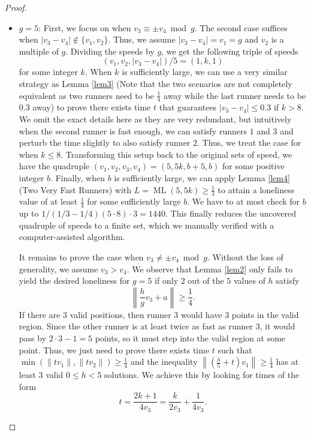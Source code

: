 \documentclass[11pt]{amsart}
\newcommand{\norm}[1]{\lVert #1 \rVert}
\newcommand{\Norm}[1]{\left\lVert #1 \right\rVert}
\DeclareMathOperator{\ML}{ML}
\begin{document}
\begin{proof}
\begin{itemize}
        \item $g = 5$: First, we focus on when $v_3 \equiv \pm v_4 \bmod g$. The second case suffices when $|v_3 - v_4| \not\in \{v_1, v_2\}$. Thus, we assume $|v_3 - v_4| = v_1 = g$ and $v_2$ is a multiple of $g$. Dividing the speeds by $g$, we get the following triple of speeds
        $$(v_1,v_2,|v_3 - v_4|) / 5 = (1,k,1)$$
        for some integer $k$. When $k$ is sufficiently large, we can use a very similar strategy as Lemma \ref{lem3} (Note that the two scenarios are not completely equivalent as two runners need to be $\frac{1}{4}$ away while the last runner needs to be $0.3$ away) to prove there exists time $t$ that guarantees $|v_3 - v_4| \leq 0.3$ if $k > 8$. We omit the exact details here as they are very redundant, but intuitively when the second runner is fast enough, we can satisfy runners $1$ and $3$ and perturb the time slightly to also satisfy runner $2$. Thus, we treat the case for when $k \leq 8$. Transforming this setup back to the original sets of speed, we have the quadruple $(v_1,v_2,v_3,v_4) = (5,5k,b + 5,b)$ for some positive integer $b$. Finally, when $b$ is sufficiently large, we can apply Lemma \ref{lem4} (Two Very Fast Runners) with $L = \ML(5,5k) \geq \frac{1}{3}$ to attain a loneliness value of at least $\frac{1}{4}$ for some sufficiently large $b$. We have to at most check for $b$ up to $1/(1/3 - 1/4)(5 \cdot 8) \cdot 3 = 1440$. This finally reduces the uncovered quadruple of speeds to a finite set, which we manually verified with a computer-assisted algorithm.
        \par It remains to prove the case when $v_3 \neq \pm v_4 \bmod g$. Without the loss of generality, we assume $v_3 > v_4$. We observe that Lemma \ref{lem2} only fails to yield the desired loneliness for $g = 5$ if only $2$ out of the $5$ values of $h$ satisfy
        $$\Norm{\frac{h}{g}v_3 + a} \geq \frac{1}{4}.$$
        If there are $3$ valid positions, then runner $3$ would have $3$ points in the valid region. Since the other runner is at least twice as fast as runner $3$, it would pass by $2 \cdot 3 - 1 = 5$ points, so it must step into the valid region at some point. Thus, we just need to prove there exists time $t$ such that $\min(\norm{tv_1},\norm{tv_2}) \geq \frac{1}{4}$ and the inequality $\Norm{\left(\frac{h}{5} + t\right)v_1} \geq \frac{1}{4}$ has at least $3$ valid $0 \leq h < 5$ solutions. We achieve this by looking for times of the form
        $$t = \frac{2k + 1}{4v_3} = \frac{k}{2v_3} + \frac{1}{4v_3}.$$

\end{itemize}
\end{proof}
\end{document}
